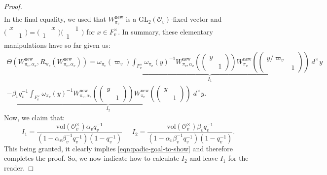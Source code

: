 \documentclass[10pt, twoside]{amsart}
\theoremstyle{plain}
\theoremstyle{definition}
\theoremstyle{remark}
\numberwithin{equation}{subsection}
\def\GL{\mathrm{GL}}
\def\new{\mathrm{new}}
\def\scro{\mathscr O}
\def\scro{\mathscr O}
\newcommand{\smallmat}[4]{\bigl(\begin{smallmatrix}#1&#2\\#3&#4\end{smallmatrix}\bigr)}
\begin{document}
\begin{proof}
\begin{align*}
\end{align*}
In the final equality, we used that $W_{\pi_v}^{\new}$ is a $\GL_2(\scro_v)$-fixed vector and $\smallmat x{}{}1 = \smallmat {}x1{} \smallmat {}11{}$ for $x \in F_v^\times$. In summary, these elementary manipulations have so far given us:
\begin{multline*}
\Theta(W_{\pi_v,\alpha_v}^{\new},R_{{ \boldsymbol{\mathrm{w}}}_v}(W_{\pi_v,\alpha_v}^{\new})) = \underset{I_1}{\underbrace{\omega_{\pi_v}(\varpi_v)\int_{F_v^\times} \omega_{\pi_v}(y)^{-1} W_{\pi_v,\alpha_v}^{\new}\left(\begin{pmatrix} y \\ & 1 \end{pmatrix}\right)W_{\pi_v}^{\new}\left(\begin{pmatrix} y/\varpi_v & \\ & 1 \end{pmatrix}\right)\; d^\times y}} \\
- \underset{I_2}{\underbrace{\beta_vq_v^{-1}\int_{F_v^\times} \omega_{\pi_v}(y)^{-1} W_{\pi_v,\alpha_v}^{\new}\left(\begin{pmatrix} y \\ & 1 \end{pmatrix}\right)W_{\pi_v}^{\new}\left(\begin{pmatrix} y & \\ & 1 \end{pmatrix}\right)\; d^\times y}}.
\end{multline*}
Now, we claim that:
\begin{equation*}
I_1 = \frac{\mathrm{vol}(\scro_v^\times) \alpha_v q_v^{-1}}{(1-\alpha_v\beta_v^{-1}q_v^{-1})(1-q_v^{-1})} \;\;\;\;\; I_2 = \frac{\mathrm{vol}(\scro_v^\times) \beta_vq_v^{-1}}{(1-\alpha_v\beta_v^{-1}q_v^{-1})(1-q_v^{-1})}.
\end{equation*}
This being granted, it clearly implies \eqref{eqn:padic-goal-to-show} and therefore completes the proof. So, we now indicate how to calculate $I_2$ and leave $I_1$ for the reader.


\end{proof}
\end{document}
